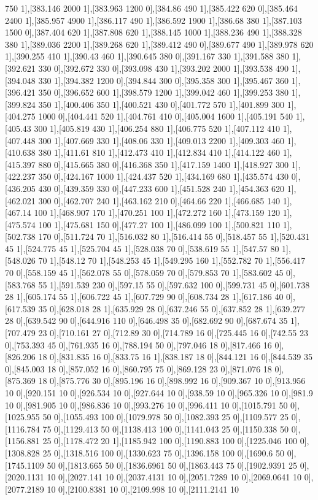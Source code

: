 {750 1],[383.146 2000 1],[383.963 1200 0],[384.86 490 1],[385.422 620 0],[385.464 2400 1],[385.957 4900 1],[386.117 490 1],[386.592 1900 1],[386.68 380 1],[387.103 1500 0],[387.404 620 1],[387.808 620 1],[388.145 1000 1],[388.236 490 1],[388.328 380 1],[389.036 2200 1],[389.268 620 1],[389.412 490 0],[389.677 490 1],[389.978 620 1],[390.255 410 1],[390.43 460 1],[390.645 380 0],[391.167 330 1],[391.588 380 1],[392.621 330 0],[392.672 330 0],[393.098 430 1],[393.202 2000 1],[393.538 490 1],[394.048 330 1],[394.382 1200 0],[394.844 300 0],[395.358 300 1],[395.467 360 1],[396.421 350 0],[396.652 600 1],[398.579 1200 1],[399.042 460 1],[399.253 380 1],[399.824 350 1],[400.406 350 1],[400.521 430 0],[401.772 570 1],[401.899 300 1],[404.275 1000 0],[404.441 520 1],[404.761 410 0],[405.004 1600 1],[405.191 540 1],[405.43 300 1],[405.819 430 1],[406.254 880 1],[406.775 520 1],[407.112 410 1],[407.448 300 1],[407.669 330 1],[408.06 330 1],[409.013 2200 1],[409.303 460 1],[410.638 380 1],[411.61 810 1],[412.473 410 1],[412.834 410 1],[414.122 460 1],[415.397 880 0],[415.665 380 0],[416.368 350 1],[417.159 1400 1],[418.927 300 1],[422.237 350 0],[424.167 1000 1],[424.437 520 1],[434.169 680 1],[435.574 430 0],[436.205 430 0],[439.359 330 0],[447.233 600 1],[451.528 240 1],[454.363 620 1],[462.021 300 0],[462.707 240 1],[463.162 210 0],[464.66 220 1],[466.685 140 1],[467.14 100 1],[468.907 170 1],[470.251 100 1],[472.272 160 1],[473.159 120 1],[475.574 100 1],[475.681 150 0],[477.27 100 1],[486.099 100 1],[500.821 110 1],[502.738 170 0],[511.724 70 1],[516.032 80 1],[516.414 55 0],[518.457 55 1],[520.431 45 1],[524.775 45 1],[525.704 45 1],[528.038 70 0],[538.619 55 1],[547.57 80 1],[548.026 70 1],[548.12 70 1],[548.253 45 1],[549.295 160 1],[552.782 70 1],[556.417 70 0],[558.159 45 1],[562.078 55 0],[578.059 70 0],[579.853 70 1],[583.602 45 0],[583.768 55 1],[591.539 230 0],[597.15 55 0],[597.632 100 0],[599.731 45 0],[601.738 28 1],[605.174 55 1],[606.722 45 1],[607.729 90 0],[608.734 28 1],[617.186 40 0],[617.539 35 0],[628.018 28 1],[635.929 28 0],[637.246 55 0],[637.852 28 1],[639.277 28 0],[639.542 90 0],[644.916 110 0],[646.498 35 0],[682.692 90 0],[687.674 35 1],[707.479 23 0],[710.161 27 0],[712.89 30 0],[714.789 16 0],[725.445 16 0],[742.55 23 0],[753.393 45 0],[761.935 16 0],[788.194 50 0],[797.046 18 0],[817.466 16 0],[826.206 18 0],[831.835 16 0],[833.75 16 1],[838.187 18 0],[844.121 16 0],[844.539 35 0],[845.003 18 0],[857.052 16 0],[860.795 75 0],[869.128 23 0],[871.076 18 0],[875.369 18 0],[875.776 30 0],[895.196 16 0],[898.992 16 0],[909.367 10 0],[913.956 10 0],[920.151 10 0],[926.534 10 0],[927.644 10 0],[938.59 10 0],[965.326 10 0],[981.9 10 0],[981.905 10 0],[986.836 10 0],[993.276 10 0],[996.411 10 0],[1015.791 50 0],[1025.955 50 0],[1055.493 100 0],[1079.978 50 0],[1082.393 25 0],[1109.577 25 0],[1116.784 75 0],[1129.413 50 0],[1138.413 100 0],[1141.043 25 0],[1150.338 50 0],[1156.881 25 0],[1178.472 20 1],[1185.942 100 0],[1190.883 100 0],[1225.046 100 0],[1308.828 25 0],[1318.516 100 0],[1330.623 75 0],[1396.158 100 0],[1690.6 50 0],[1745.1109 50 0],[1813.665 50 0],[1836.6961 50 0],[1863.443 75 0],[1902.9391 25 0],[2020.1131 10 0],[2027.141 10 0],[2037.4131 10 0],[2051.7289 10 0],[2069.0641 10 0],[2077.2189 10 0],[2100.8381 10 0],[2109.998 10 0],[2111.2141 10 }
